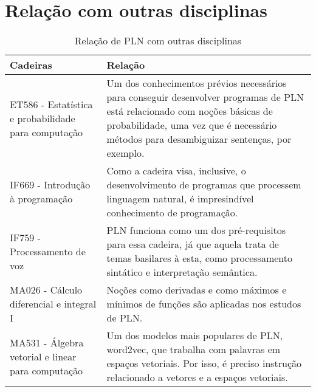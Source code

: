 \documentclass[a4paper]{article}
\begin{document}
\section{Relação com outras disciplinas}

\begin{table}[h]
\centering
\caption{Relação de PLN com outras disciplinas}
\label{my-label}
\begin{tabular}{|l|p{8.0cm}|}
\toprule
\textbf{Cadeiras} & \textbf{Relação} \\ \midrule
ET586 - Estatística e probabilidade para computação & Um dos conhecimentos prévios necessários para conseguir desenvolver programas de PLN está relacionado com noções básicas de probabilidade, uma vez que é necessário métodos para desambiguizar sentenças, por exemplo. \\ \midrule
IF669 - Introdução à programação                    & Como a cadeira visa, inclusive, o desenvolvimento de programas que processem linguagem natural, é impresindível conhecimento de programação.                                                                           \\ \midrule
IF759 - Processamento de voz                        & PLN funciona como um dos pré-requisitos para essa cadeira, já que aquela trata de temas basilares à esta, como processamento sintático e interpretação semântica.                                                      \\ \midrule
MA026 - Cálculo diferencial e integral I            & Noções como derivadas e como máximos e mínimos de funções são aplicadas nos estudos de PLN.                                                                                                                            \\ \midrule
MA531 - Álgebra vetorial e linear para computação   & Um dos modelos mais populares de PLN, word2vec, que trabalha com palavras em espaços vetoriais. Por isso, é preciso instrução relacionado a vetores e a espaços vetoriais.                                             \\ \bottomrule
\end{tabular}
\end{table}

\nocite{martin2009speech}
\nocite{schutze2008introduction}
\nocite{bird2009natural}



\end{document}
